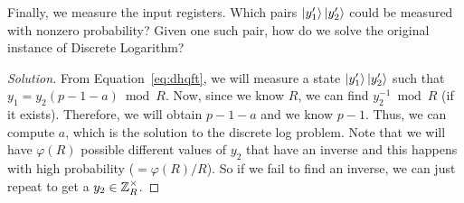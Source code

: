 \begin{solution}[label=ques:4e]
  \begin{question}
    Finally, we measure the input registers. Which pairs $\ket{y_1'}\ket{y_2'}$ could be measured with nonzero probability? Given one such pair, how do we solve the original instance of Discrete Logarithm?
  \end{question}
  \tcblower{}
  \begin{proof}[Solution]
    From Equation~\ref{eq:dhqft}, we will measure a state $\ket{y_1'}\ket{y_2'}$ such that $y_1 = y_2(p - 1 - a) \bmod R$. Now, since we know $R$, we can find $y_2^{-1} \bmod R$ (if it exists). Therefore, we will obtain $p - 1 - a$ and we know $p - 1$. Thus, we can compute $a$, which is the solution to the discrete log problem. Note that we will have $\varphi(R)$ possible different values of $y_2$ that have an inverse and this happens with high probability ($= \varphi(R) / R$). So if we fail to find an inverse, we can just repeat to get a $y_2 \in \mathbb{Z}_R^\times$.
  \end{proof}
\end{solution}
